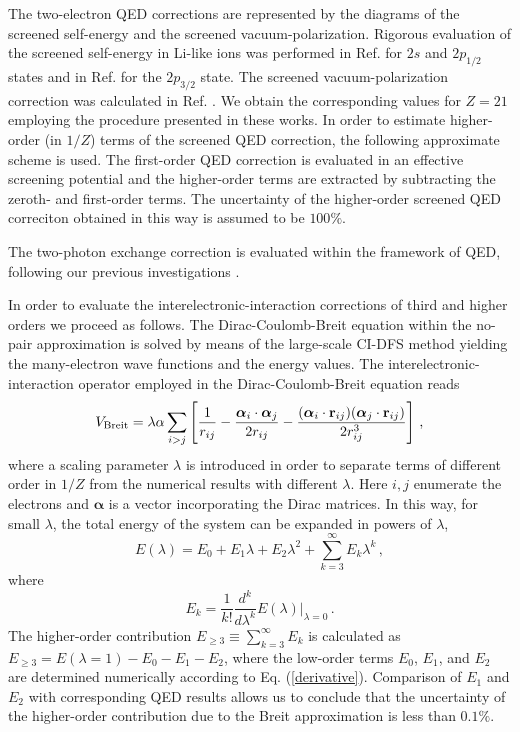 \documentclass[preprint,aps,pra,showpacs,floatfix]{revtex4}
\newcommand{\balpha}{\bm{\alpha}}
\newcommand{\bfr}{{\bf r}}
\newcommand{\kk}{\lambda}
\newcommand{\al}{\alpha}
\newcommand{\albi}{\boldsymbol{\alpha}_i}
\newcommand{\albj}{\boldsymbol{\alpha}_j}
\begin{document}
The two-electron QED corrections are represented by the diagrams of the screened
self-energy and the screened vacuum-polarization. Rigorous evaluation of
the screened self-energy in Li-like ions was performed in Ref. \cite{yerokhin:PRA:99}
for $2s$ and $2p_{1/2}$ states and in Ref. \cite{yerokhin:OS:05} for the $2p_{3/2}$ state.
%
The screened vacuum-polarization correction was calculated in Ref. \cite{PRA60_45}.
We obtain the corresponding values for $Z=21$ employing the procedure presented
in these works. In order to estimate higher-order (in $1/Z$) terms of the screened
QED correction, the following approximate scheme is used. The first-order QED
correction is evaluated in an effective screening potential and the higher-order
terms are extracted by subtracting the zeroth- and  first-order terms.
The uncertainty of the higher-order screened QED correciton obtained in this way
is assumed to be $100\%$.

The two-photon exchange correction is evaluated within the framework of QED,
following our previous investigations \cite{PRA67_062506,PRA64_032109}.

In order to evaluate the interelectronic-interaction corrections of third
and higher orders we proceed as follows. The Dirac-Coulomb-Breit equation
within the no-pair approximation is solved by means of the large-scale CI-DFS
method \cite{PRA68_022511,PRA72_062503} yielding the many-electron wave functions
and the energy values. The interelectronic-interaction operator employed
in the Dirac-Coulomb-Breit equation reads
%
\begin{eqnarray}
\label{interaction}
  V_{\rm Breit} = \kk\al \sum_{i>j} \left[ \frac{1}{r_{ij}} - \frac{\albi \cdot \albj}{2r_{ij}}
  - \frac{(\albi \cdot \bfr_{ij}) (\albj \cdot \bfr_{ij})}{2r^{3}_{ij}}\right]
\,,
\end{eqnarray}
%
where a scaling parameter $\kk$ is introduced in order to separate terms
of different order in $1/Z$ from the numerical results with different $\kk$.
Here $i,j$ enumerate the electrons and $\balpha$ is a vector incorporating
the Dirac matrices. In this way, for small $\kk$, the total energy of the system
can be expanded in powers of $\kk$,
%
\begin{equation}
  E(\kk)=E_{0}+E_{1}{\kk}+E_{2}{\kk^{2}}+\sum_{k=3}^\infty E_{k} {\kk^k}
\,,
\end{equation}
%
where
%
\begin{equation}
\label{derivative}
  E_{k} = \frac{1}{k!} \frac{d^k}{d\kk^k}E(\kk)\Big|_{\kk=0}
\,.
\end{equation}
%
The higher-order contribution $E_{\geqslant 3}\equiv\sum_{k=3}^{\infty}E_k$
is calculated as $E_{\geqslant 3}=E(\kk=1)-E_{0}-E_{1}-E_{2}$, where the low-order
terms $E_0$, $E_1$, and $E_2$ are determined numerically according to Eq. (\ref{derivative}).
Comparison of $E_{1}$ and $E_{2}$ with corresponding QED results allows us
to conclude that the uncertainty of the higher-order contribution due to the Breit
approximation is less than $0.1\%$.
\end{document}
